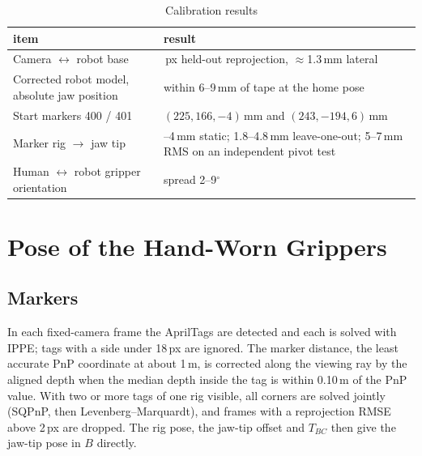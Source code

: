 \documentclass[conference,10pt]{IEEEtran}
\newcommand{\mm}{\,mm\xspace}
\begin{document}
\begin{table}[t]
\caption{Calibration results}\label{tab:cal}
\centering\small
\begin{tabular}{@{}>{\raggedright\arraybackslash}p{}>{\raggedright\arraybackslash}p{}@{}}
\toprule
item & result \\
\midrule
Camera $\leftrightarrow$ robot base & 0.98\,px held-out reprojection, $\approx$1.3\mm lateral \\
Corrected robot model, absolute jaw position & within 6--9\mm of tape at the home pose \\
Start markers 400 / 401 & $(225, 166, -4)$\mm and $(243, -194, 6)$\mm \\
Marker rig $\to$ jaw tip & 1--4\mm static; 1.8--4.8\mm leave-one-out; 5--7\mm RMS on an independent pivot test \\
Human $\leftrightarrow$ robot gripper orientation & spread 2--9$^\circ$ \\
\bottomrule
\end{tabular}
\end{table}

\section{Pose of the Hand-Worn Grippers}\label{sec:pose}
\subsection{Markers}
In each fixed-camera frame the AprilTags are detected and each is solved with IPPE; tags with a side under 18\,px are
ignored. The marker distance, the least accurate PnP coordinate at about 1\,m, is corrected along the viewing ray by the
aligned depth when the median depth inside the tag is within 0.10\,m of the PnP value. With two or more tags of one rig
visible, all corners are solved jointly (SQPnP, then Levenberg--Marquardt), and frames with a reprojection RMSE above
2\,px are dropped. The rig pose, the jaw-tip offset and $T_{BC}$ then give the jaw-tip pose in $B$ directly.
\end{document}
